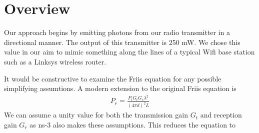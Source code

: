 \documentclass[%
        final,
        notitlepage,
        narroweqnarray,
        inline,
        twoside,
        ]{ieee}
\begin{document}




\section{Overview}
Our approach begins by emitting photons from our radio transmitter in a
directional manner.  The output of this transmitter is 250 mW.  We chose this
value in our aim to mimic something along the lines of a typical Wifi base
station such as a Linksys wireless router.

It would be constructive to examine the Friis equation for any possible
simplifying assumtions.  A modern extension to the original Friis equation
\cite{1697062} is
\begin{eqnarray}
P_r = \frac{P_t G_t G_r \lambda^2}{(4 \pi d)^2 L}
\end{eqnarray}
We can assume a unity value for both the transmission gain $G_t$ and reception
gain $G_r$ as ns-3 also makes these assumptions.  This reduces the equation to
\end{document}

